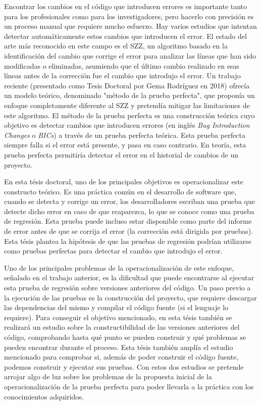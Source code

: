 Encontrar los cambios en el código que introducen errores es importante tanto para los profesionales como para los investigadores, pero hacerlo con precisión es un proceso manual que requiere mucho esfuerzo.
Hay varios estudios que intentan detectar automáticamente estos cambios que introducen el error. 
El estado del arte más reconocido en este campo es el SZZ, un algoritmo basado en la identificación del cambio que corrige el error para analizar las líneas que han sido modificadas o eliminadas, asumiendo que el último cambio realizado en esas líneas antes de la corrección fue el cambio que introdujo el error. 
Un trabajo reciente (presentado como Tesis Doctoral por Gema Rodríguez en 2018) ofrecía un modelo teórico, denominado "método de la prueba perfecta", que proponía un enfoque completamente diferente al SZZ y pretendía mitigar las limitaciones de este algoritmo. 
El método de la prueba perfecta es una construcción teórica cuyo objetivo es detectar cambios que introducen errores (en inglés \textit{Bug Introduction Changes} o \textit{BICs}) a través de un prueba perfecta teórica. 
Esta prueba perfecta siempre falla si el error está presente, y pasa en caso contrario.
En teoría, esta prueba perfecta permitiría detectar el error en el historial de cambios de un proyecto.

En esta tésis doctoral, uno de los principales objetivos es operacionalizar este constructo teórico.
Es una práctica común en el desarrollo de software que, cuando se detecta y corrige un error, los desarrolladores escriban una prueba que detecte dicho error en caso de que reaparezca, lo que se conoce como una prueba de regresión. 
Esta prueba puede incluso estar disponible como parte del informe de error antes de que se corrija el error (la corrección está dirigida por pruebas). 
Esta tésis plantea la hipótesis de que las pruebas de regresión podrían utilizarse como pruebas perfectas para detectar el cambio que introdujo el error.

Uno de los principales problemas de la operacionalización de este enfoque, señalado en el trabajo anterior, es la dificultad que puede encontrarse al ejecutar esta prueba de regresión sobre versiones anteriores del código. 
Un paso previo a la ejecución de las pruebas es la construcción del proyecto, que requiere descargar las dependencias del mismo y compilar el código fuente (si el lenguaje lo requiere). 
Para conseguir el objetivo mencionado, en esta tésis también se realizará un estudio sobre la constructibilidad de las versiones anteriores del código, comprobando hasta qué punto se pueden construir y qué problemas se pueden encontrar durante el proceso.
Esta tésis también amplía el estudio mencionado para comprobar si, además de poder construir el código fuente, podemos construir y ejecutar sus pruebas. 
Con estos dos estudios se pretende arrojar algo de luz sobre los problemas de la propuesta inicial de la operacionalización de la prueba perfecta para poder llevarla a la práctica con los conocimientos adquiridos.


